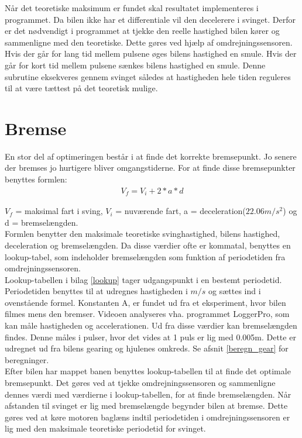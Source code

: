 Når det teoretiske maksimum er fundet skal resultatet implementeres i programmet. Da bilen ikke har et differentiale vil den decelerere i svinget. Derfor er det nødvendigt i programmet at tjekke den reelle hastighed bilen kører og sammenligne med den teoretiske. Dette gøres ved hjælp af omdrejningssensoren. Hvis der går for lang tid mellem pulsene øges bilens hastighed en smule. Hvis der går for kort tid mellem pulsene sænkes bilens hastighed en smule. Denne subrutine eksekveres gennem svinget således at hastigheden hele tiden reguleres til at være tættest på det teoretisk mulige. \\

\section{Bremse}
\label{bremse}
En stor del af optimeringen består i at finde det korrekte bremsepunkt. Jo senere der bremses jo hurtigere bliver omgangstiderne. For at finde disse bremsepunkter benyttes formlen: \\
\begin{align*}
V_f = V_i +2*a*d
\end{align*}

$V_f$ = maksimal fart i sving, $V_i$ = nuværende fart, a = deceleration(\(22.06m/s^2\)) og d = bremselængden. \\

Formlen benytter den maksimale teoretiske svinghastighed, bilens hastighed, deceleration og bremselængden. Da disse værdier ofte er kommatal, benyttes en lookup-tabel, som indeholder bremselængden som funktion af periodetiden fra omdrejningssensoren. \\

Lookup-tabellen i bilag \ref{lookup} tager udgangspunkt i en bestemt periodetid. Periodetiden benyttes til at udregnes hastigheden i $m/s$ og sættes ind i ovenstående formel. Konstanten A, er fundet ud fra et eksperiment, hvor bilen filmes mens den bremser. Videoen analyseres vha. programmet LoggerPro, som kan måle hastigheden og accelerationen. Ud fra disse værdier kan bremselængden findes. Denne måles i pulser, hvor det vides at 1 puls er lig med 0.005m. Dette er udregnet ud fra bilens gearing og hjulenes omkreds. Se afsnit \ref{beregn_gear} for beregninger.\\

Efter bilen har mappet banen benyttes lookup-tabellen til at finde det optimale bremsepunkt. Det gøres ved at tjekke omdrejningssensoren og sammenligne dennes værdi med værdierne i lookup-tabellen, for at finde bremselængden. Når afstanden til svinget er lig med bremselængde begynder bilen at bremse. Dette gøres ved at køre motoren baglæns indtil periodetiden i omdrejningssensoren er lig med den maksimale teoretiske periodetid for svinget. \\

